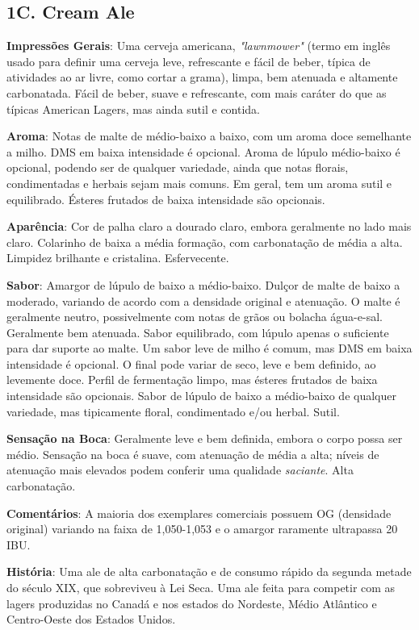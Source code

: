 \subsection*{1C. Cream Ale}
\textbf{Impressões Gerais}: Uma cerveja americana, \textit{"lawnmower"} (termo em inglês usado para definir uma cerveja leve, refrescante e fácil de beber, típica de atividades ao ar livre, como cortar a grama), limpa, bem atenuada e altamente carbonatada. Fácil de beber, suave e refrescante, com mais caráter do que as típicas American Lagers, mas ainda sutil e contida.

\textbf{Aroma}: Notas de malte de médio-baixo a baixo, com um aroma doce semelhante a milho. DMS em baixa intensidade é opcional. Aroma de lúpulo médio-baixo é opcional, podendo ser de qualquer variedade, ainda que notas florais, condimentadas e herbais sejam mais comuns. Em geral, tem um aroma sutil e equilibrado. Ésteres frutados de baixa intensidade são opcionais.

\textbf{Aparência}: Cor de palha claro a dourado claro, embora geralmente no lado mais claro. Colarinho de baixa a média formação, com carbonatação de média a alta. Limpidez brilhante e cristalina. Esfervecente.

\textbf{Sabor}: Amargor de lúpulo de baixo a médio-baixo. Dulçor de malte de baixo a moderado, variando de acordo com a densidade original e atenuação. O malte é geralmente neutro, possivelmente com notas de grãos ou bolacha água-e-sal. Geralmente bem atenuada. Sabor equilibrado, com lúpulo apenas o suficiente para dar suporte ao malte. Um sabor leve de milho é comum, mas DMS em baixa intensidade é opcional. O final pode variar de seco, leve e bem definido, ao levemente doce. Perfil de fermentação limpo, mas ésteres frutados de baixa intensidade são opcionais. Sabor de lúpulo de baixo a médio-baixo de qualquer variedade, mas tipicamente floral, condimentado e/ou herbal. Sutil.

\textbf{Sensação na Boca}: Geralmente leve e bem definida, embora o corpo possa ser médio. Sensação na boca é suave, com atenuação de média a alta; níveis de atenuação mais elevados podem conferir uma qualidade \textit{saciante}. Alta carbonatação.

\textbf{Comentários}: A maioria dos exemplares comerciais possuem OG (densidade original) variando na faixa de 1,050-1,053 e o amargor raramente ultrapassa 20 IBU.

\textbf{História}: Uma ale de alta carbonatação e de consumo rápido da segunda metade do século XIX, que sobreviveu à Lei Seca. Uma ale feita para competir com as lagers produzidas no Canadá e nos estados do Nordeste, Médio Atlântico e Centro-Oeste dos Estados Unidos.

